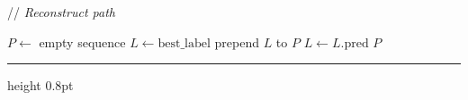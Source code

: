 \documentclass{article}
\newcommand{\CommentLine}[1]{
    \State // \textit{#1}
}
\begin{document}
\begin{algorithmic}[1]
    \vspace{0.5em}
    \CommentLine{Reconstruct path}
    \State $P \leftarrow$ empty sequence
    \State $L \leftarrow \text{best\_label}$
        \State prepend $L$ to $P$
        \State $L \leftarrow L.\text{pred}$
    \EndWhile
    \State \Return $P$

\end{algorithmic}

\hrule height 0.8pt
\end{document}
